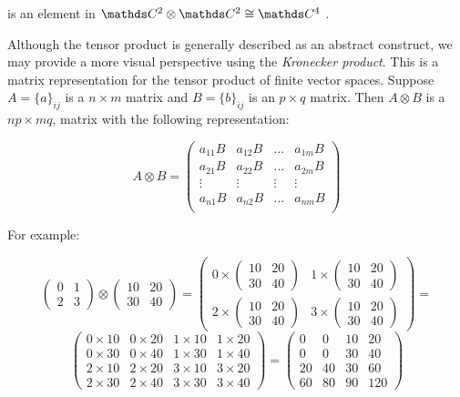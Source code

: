 is an element in $\C^2 \otimes \C^2 \cong \C^4$ .

Although the tensor product is generally described as an abstract construct, we may provide a more visual perspective using the \emph{Kronecker product}. This is a matrix representation for the tensor product of finite vector spaces. Suppose $A = \{a\}_{ij}$ is a $n \times m$ matrix and $B = \{b\}_{ij}$ is an $p \times q$ matrix. Then $A \otimes B$ is a $np \times mq$, matrix with the following representation:

$$ A \otimes B = 
\begin{pmatrix}
	a_{11}B & a_{12}B & \dotsc & a_{1m}B \\
	a_{21}B & a_{22}B & \dotsc & a_{2m}B \\
	\vdots & \vdots & \vdots & \vdots \\
	a_{n1}B & a_{n2}B & \dotsc & a_{nm}B \\
\end{pmatrix}
$$

For example:

$$ \begin{pmatrix}
	0 & 1 \\
	2 & 3
\end{pmatrix} \otimes
\begin{pmatrix}
	10 & 20 \\
	30 & 40
\end{pmatrix} =
\begin{pmatrix}
	0 \times \begin{pmatrix} 10 & 20 \\ 30 & 40 \end{pmatrix} &
	1 \times \begin{pmatrix} 10 & 20 \\ 30 & 40 \end{pmatrix} \\
	2 \times \begin{pmatrix} 10 & 20 \\ 30 & 40 \end{pmatrix} &
	3 \times \begin{pmatrix} 10 & 20 \\ 30 & 40 \end{pmatrix}
\end{pmatrix} = 
$$
$$ 
\begin{pmatrix}
	0 \times 10 & 0 \times 20 & 1 \times 10 & 1 \times 20 \\
	0 \times 30 & 0 \times 40 & 1 \times 30 & 1 \times 40 \\
	2 \times 10 & 2 \times 20 & 3 \times 10 & 3 \times 20 \\
	2 \times 30 & 2 \times 40 & 3 \times 30 & 3 \times 40
\end{pmatrix} = 
\begin{pmatrix}
	0 & 0 & 10 & 20 \\
	0 & 0 & 30 & 40 \\
	20 & 40 & 30 & 60 \\
	60 & 80 & 90 & 120
\end{pmatrix}
$$

